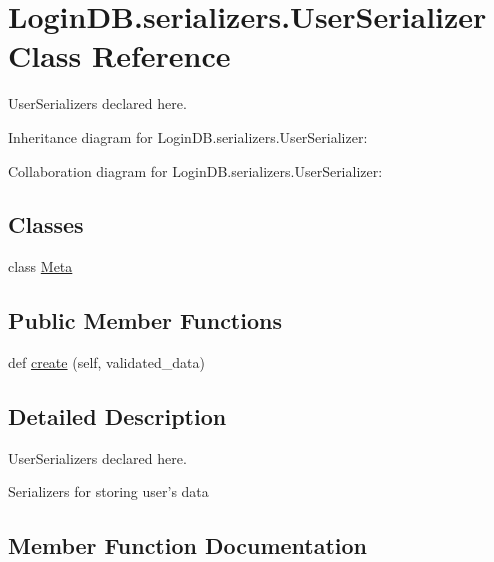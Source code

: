 \hypertarget{class_login_d_b_1_1serializers_1_1_user_serializer}{}\section{Login\+D\+B.\+serializers.\+User\+Serializer Class Reference}
\label{class_login_d_b_1_1serializers_1_1_user_serializer}


User\+Serializers declared here.  




Inheritance diagram for Login\+D\+B.\+serializers.\+User\+Serializer\+:


Collaboration diagram for Login\+D\+B.\+serializers.\+User\+Serializer\+:
\subsection*{Classes}
\begin{DoxyCompactItemize}
\item 
class \hyperlink{class_login_d_b_1_1serializers_1_1_user_serializer_1_1_meta}{Meta}
\end{DoxyCompactItemize}
\subsection*{Public Member Functions}
\begin{DoxyCompactItemize}
\item 
def \hyperlink{class_login_d_b_1_1serializers_1_1_user_serializer_a3080a92369104c6bc408a555aec5e84d}{create} (self, validated\+\_\+data)
\end{DoxyCompactItemize}


\subsection{Detailed Description}
User\+Serializers declared here. 

\begin{DoxyVerb}Serializers for storing user's data
\end{DoxyVerb}
 

\subsection{Member Function Documentation}
\mbox{\label{class_login_d_b_1_1serializers_1_1_user_serializer_a3080a92369104c6bc408a555aec5e84d}} 

